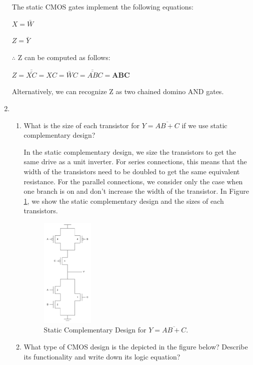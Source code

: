 \documentclass[fleqn]{article}
\begin{document}
\begin{enumerate}
			The static CMOS gates implement the following equations:
			
			$X = \bar{W}$
			
			$Z = \bar{Y}$
			
			$\therefore$ Z can be computed as follows:
			
			$Z = \overline{\overline{XC}} = XC = \bar{W}C = \overline{\overline{AB}}C = \mathbf{ABC}$
			
			Alternatively, we can recognize Z as two chained domino AND gates.
			
		\item ~
		
			\begin{enumerate}
			
			\item[1.] What is the size of each transistor for $Y = \overline{AB + C}$ if we use static complementary design?
			
			In the static complementary design, we size the transistors to get the same drive as a unit inverter. For series connections, this means that the width of the transistors need to be doubled to get the same equivalent resistance. For the parallel connections, we consider only the case when one branch is on and don't increase the width of the transistor. In Figure \ref{fig::circuit4a}, we show the static complementary design and the sizes of each transistors.
			
			\begin{figure}[H]
				\centerline{\includegraphics[width=0.25\textwidth]{circuit4a.png}}
				\caption{Static Complementary Design for $Y = \overline{AB + C}$.}
				\label{fig::circuit4a}
			\end{figure}
			
			\item[2.] What type of CMOS design is the depicted in the figure below? Describe its functionality and write down its logic equation?
			

\end{enumerate}
\end{enumerate}
\end{document}
